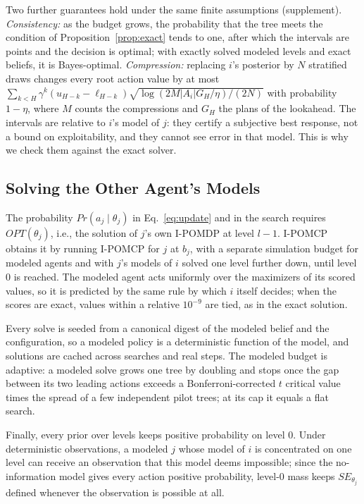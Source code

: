 \documentclass{article}
\newcommand{\SE}{\mathit{SE}}
\newcommand{\OPT}{\mathit{OPT}}
\renewcommand{\Pr}{\mathit{Pr}}
\begin{document}
Two further guarantees hold under the same finite assumptions (supplement). \emph{Consistency:} as the budget grows, the probability that the tree meets the condition of Proposition~\ref{prop:exact} tends to one, after which the intervals are points and the decision is optimal; with exactly solved modeled levels and exact beliefs, it is Bayes-optimal. \emph{Compression:} replacing $i$'s posterior by $N$ stratified draws changes every root action value by at most $\sum_{k<H} \gamma^k (u_{H-k} - \ell_{H-k}) \sqrt{\log(2 M |A_i| G_H / \eta)/(2N)}$ with probability $1 - \eta$, where $M$ counts the compressions and $G_H$ the plans of the lookahead. The intervals are relative to $i$'s model of $j$: they certify a subjective best response, not a bound on exploitability, and they cannot see error in that model. This is why we check them against the exact solver.

\subsection{Solving the Other Agent's Models}
\label{sec:modeled}

The probability $\Pr(a_j \mid \theta_j)$ in Eq.~\ref{eq:update} and in the search requires $\OPT(\theta_j)$, i.e., the solution of $j$'s own I-POMDP at level $l-1$. I-POMCP obtains it by running I-POMCP for $j$ at $b_j$, with a separate simulation budget for modeled agents and with $j$'s models of $i$ solved one level further down, until level 0 is reached. The modeled agent acts uniformly over the maximizers of its scored values, so it is predicted by the same rule by which $i$ itself decides; when the scores are exact, values within a relative $10^{-9}$ are tied, as in the exact solution.

Every solve is seeded from a canonical digest of the modeled belief and the configuration, so a modeled policy is a deterministic function of the model, and solutions are cached across searches and real steps. The modeled budget is adaptive: a modeled solve grows one tree by doubling and stops once the gap between its two leading actions exceeds a Bonferroni-corrected $t$ critical value times the spread of a few independent pilot trees; at its cap it equals a flat search.

Finally, every prior over levels keeps positive probability on level 0. Under deterministic observations, a modeled $j$ whose model of $i$ is concentrated on one level can receive an observation that this model deems impossible; since the no-information model gives every action positive probability, level-0 mass keeps $\SE_{\theta_j}$ defined whenever the observation is possible at all.
\end{document}
